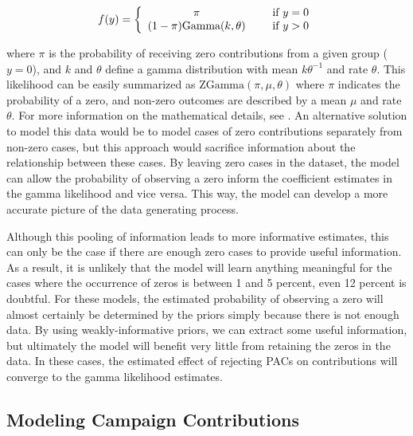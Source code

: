 \documentclass[12pt]{article}
\begin{document}
\begin{align}
f(y) = \left\{ \begin{array}{cc} 
                \pi & \hspace{5mm} \text{if $y = 0$} \\
                (1 - \pi) \text{Gamma}(k, \theta) & \hspace{5mm}  \text{if $y > 0$} \\
                \end{array} \right.
\end{align}

\noindent where $\pi$ is the probability of receiving zero contributions from a given group ($y = 0$), and $k$ and $\theta$ define a gamma distribution with mean $k\theta^{-1}$ and rate $\theta$. This likelihood can be easily summarized as $\text{ZGamma}(\pi, \mu, \theta)$ where $\pi$ indicates the probability of a zero, and non-zero outcomes are described by a mean $\mu$ and rate $\theta$. For more information on the mathematical details, see \citet{mccullagn1989}. An alternative solution to model this data would be to model cases of zero contributions separately from non-zero cases, but this approach would sacrifice information about the relationship between these cases. By leaving zero cases in the dataset, the model can allow the probability of observing a zero inform the coefficient estimates in the gamma likelihood and vice versa. This way, the model can develop a more accurate picture of the data generating process.

Although this pooling of information leads to more informative estimates, this can only be the case if there are enough zero cases to provide useful information. As a result, it is unlikely that the model will learn anything meaningful for the cases where the occurrence of zeros is between 1 and 5 percent, even 12 percent is doubtful. For these models, the estimated probability of observing a zero will almost certainly be determined by the priors simply because there is not enough data. By using weakly-informative priors, we can extract some useful information, but ultimately the model will benefit very little from retaining the zeros in the data. In these cases, the estimated effect of rejecting PACs on contributions will converge to the gamma likelihood estimates. 

\subsection{Modeling Campaign Contributions}
\end{document}

